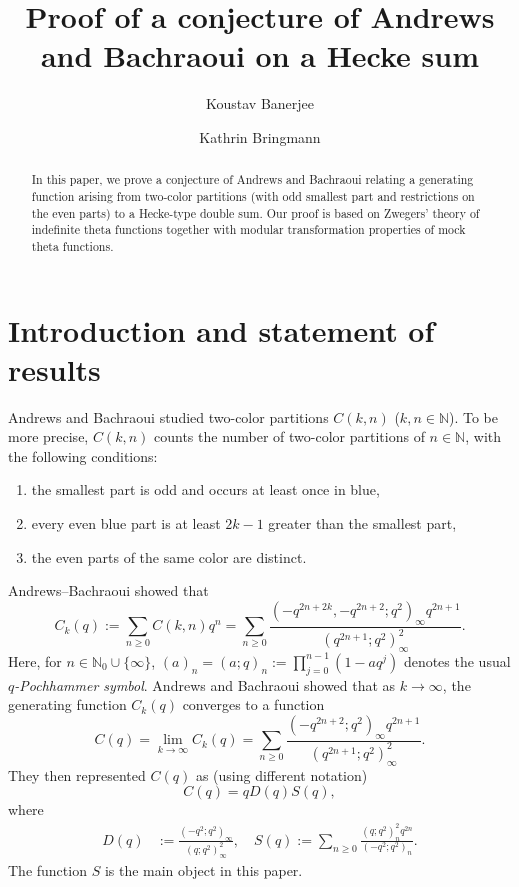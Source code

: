 \documentclass[12pt,reqno]{amsart}
\title[Hecke sum]{Proof of a conjecture of Andrews and Bachraoui on a Hecke sum}
\author{Koustav Banerjee}
\author{Kathrin Bringmann}
\renewcommand{\(}{\left\(}
\renewcommand{\)}{\right\)}
\numberwithin{equation}{section}
\theoremstyle{plain}
\theoremstyle{definition}
\numberwithin{equation}{section}
\begin{document}
	


\begin{abstract}

In this paper, we prove a conjecture of Andrews and Bachraoui relating a generating function arising from two-color partitions (with odd smallest part and restrictions on the even parts) to a Hecke-type double sum. Our proof is based on Zwegers' theory of indefinite theta functions together with modular transformation properties of mock theta functions.

\end{abstract}

\maketitle







\section{Introduction and statement of results}

 Andrews and Bachraoui \cite{AB} studied two-color partitions $C(k,n)$ ($k,n\in \mathbb{N}$). To be more precise, $C(k,n)$ counts the number of two-color partitions of $n\in \mathbb{N}$, with the following conditions:
 \begin{enumerate}
 	\item the smallest part is odd and occurs at least once in blue,
 	\item every even blue part is at least $2k-1$ greater than the smallest part,
 	\item the even parts of the same color are distinct.
 \end{enumerate}
 Andrews--Bachraoui \cite[(1.1)]{AB} showed that
\[
C_k(q):=\sum_{n\ge 0}C\left(k,n\right)q^n=\sum_{n\ge 0}\frac{\left(-q^{2n+2k},-q^{2n+2};q^2\right)_{\infty}q^{2n+1}}{\left(q^{2n+1};q^2\right)^2_{\infty}}.
\]  
Here, for $n\in \mathbb{N}_0\cup \{\infty\}$, $(a)_n=(a;q)_n:=\prod_{j=0}^{n-1}(1-aq^j)$ denotes the usual {\it $q$-Pochhammer symbol}. Andrews and Bachraoui \cite[Section 10]{AB} showed that as $k\to \infty$, the generating function $C_k(q)$ converges to a function
\[
C(q)=\lim_{k\to \infty}C_k(q)=\sum_{n\ge 0}\frac{\left(-q^{2n+2};q^2\right)_{\infty}q^{2n+1}}{\left(q^{2n+1};q^2\right)^2_{\infty}}.
\]
They then represented $C(q)$ as  (using different notation)
\begin{equation*}%
C(q)=qD(q)S(q),
\end{equation*}
where%
\begin{align*}%
D(q)&:=\!\frac{\left(-q^2;q^2\right)_{\infty}}{\left(q;q^2\right)^2_{\infty}},\quad 
S(q):=\!\sum_{n\ge 0}\frac{\left(q;q^2\right)^2_n q^{2n}}{\left(-q^2;q^2\right)_n}.
\end{align*}
The function $S$ is the main object in this paper.
\end{document}
